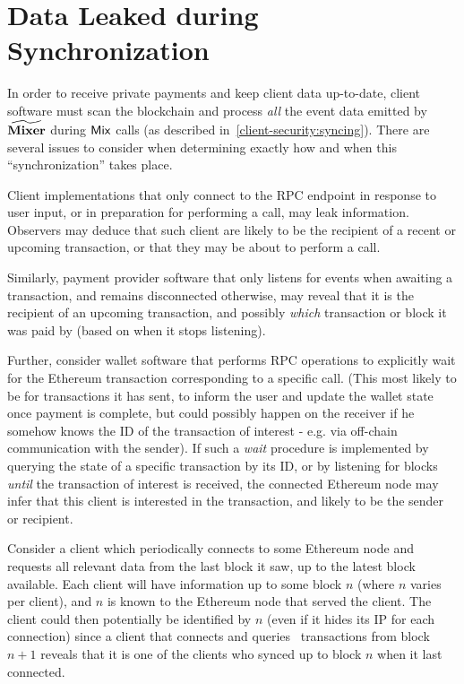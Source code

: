 \section{Data Leaked during Synchronization}\label{appendix:sca-attacks:synchronization}

In order to receive private payments and keep client data up-to-date, \zeth{} client software must scan the blockchain and process \emph{all} the event data emitted by $\widetilde{\mathbf{Mixer}}$ during $\mathsf{Mix}$ calls (as described in~\cref{client-security:syncing}). There are several issues to consider when determining exactly how and when this ``synchronization'' takes place.

Client implementations that only connect to the RPC endpoint in response to user input, or in preparation for performing a \mix{} call, may leak information. Observers may deduce that such client are likely to be the recipient of a recent or upcoming transaction, or that they may be about to perform a \mix{} call.

Similarly, payment provider software that only listens for events when awaiting a transaction, and remains disconnected otherwise, may reveal that it is the recipient of an upcoming transaction, and possibly \emph{which} transaction or block it was paid by (based on when it stops listening).

Further, consider wallet software that performs RPC operations to explicitly wait for the Ethereum transaction corresponding to a specific \mix{} call. (This most likely to be for transactions it has sent, to inform the user and update the wallet state once payment is complete, but could possibly happen on the receiver if he somehow knows the ID of the transaction of interest - e.g. via off-chain communication with the sender).  If such a \emph{wait} procedure is implemented by querying the state of a specific transaction by its ID, or by listening for blocks \emph{until} the transaction of interest is received, the connected Ethereum node may infer that this client is interested in the transaction, and likely to be the sender or recipient.

Consider a client which periodically connects to some Ethereum node and requests all relevant data from the last block it saw, up to the latest block available. Each client will have information up to some block $n$ (where $n$ varies per client), and $n$ is known to the Ethereum node that served the client.  The client could then potentially be identified by $n$ (even if it hides its IP for each connection) since a client that connects and queries \zeth~transactions from block $n + 1$ reveals that it is one of the clients who synced up to block $n$ when it last connected.

